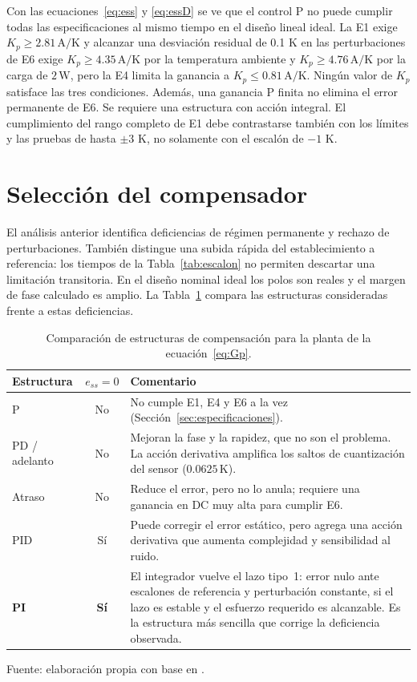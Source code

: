 \documentclass[journal,twocolumn]{IEEEtran}
\begin{document}
Con las ecuaciones~\eqref{eq:ess} y \eqref{eq:essD} se ve que el control P no puede cumplir todas las especificaciones al mismo tiempo en el diseño lineal ideal. La E1 exige $K_p\ge2.81\,\mathrm{A/K}$ y alcanzar una desviación residual de 0.1 K en las perturbaciones de E6 exige $K_p\ge4.35\,\mathrm{A/K}$ por la temperatura ambiente y $K_p\ge4.76\,\mathrm{A/K}$ por la carga de $2\,\mathrm W$, pero la E4 limita la ganancia a $K_p\le0.81\,\mathrm{A/K}$. Ningún valor de $K_p$ satisface las tres condiciones. Además, una ganancia P finita no elimina el error permanente de E6. Se requiere una estructura con acción integral. El cumplimiento del rango completo de E1 debe contrastarse también con los límites y las pruebas de hasta $\pm3$ K, no solamente con el escalón de $-1$ K.

\section{Selección del compensador}\label{sec:seleccion}
El análisis anterior identifica deficiencias de régimen permanente y rechazo de perturbaciones. También distingue una subida rápida del establecimiento a referencia: los tiempos de la Tabla~\ref{tab:escalon} no permiten descartar una limitación transitoria. En el diseño nominal ideal los polos son reales y el margen de fase calculado es amplio. La Tabla~\ref{tab:seleccion} compara las estructuras consideradas frente a estas deficiencias.

\begin{table}[!tbp]\centering
\caption{Comparación de estructuras de compensación para la planta de la ecuación~\eqref{eq:Gp}.}\label{tab:seleccion}
{\footnotesize\setlength{\tabcolsep}{3pt}\renewcommand{\arraystretch}{1.15}
\begin{tabularx}{\columnwidth}{lc>{\raggedright\arraybackslash}X}\toprule
Estructura & $e_{ss}=0$ & Comentario\\\midrule
P & No & No cumple E1, E4 y E6 a la vez (Sección~\ref{sec:especificaciones}).\\
PD / adelanto & No & Mejoran la fase y la rapidez, que no son el problema. La acción derivativa amplifica los saltos de cuantización del sensor ($0.0625\,\mathrm K$).\\
Atraso & No & Reduce el error, pero no lo anula; requiere una ganancia en DC muy alta para cumplir E6.\\
PID & Sí & Puede corregir el error estático, pero agrega una acción derivativa que aumenta complejidad y sensibilidad al ruido.\\
\textbf{PI} & \textbf{Sí} & El integrador vuelve el lazo tipo~1: error nulo ante escalones de referencia y perturbación constante, si el lazo es estable y el esfuerzo requerido es alcanzable. Es la estructura más sencilla que corrige la deficiencia observada.\\\bottomrule
\end{tabularx}}
\par\smallskip\footnotesize Fuente: elaboración propia con base en \cite{ogata}.
\end{table}
\end{document}
